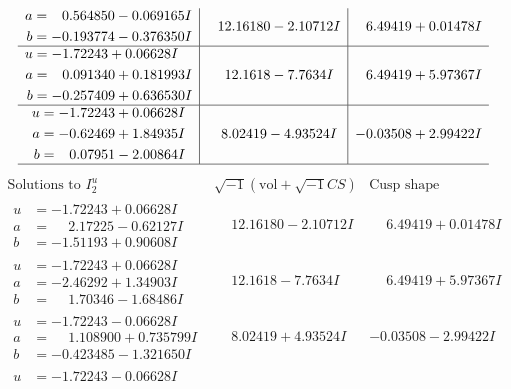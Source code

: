 \documentclass[1p]{elsarticle_modified}
\theoremstyle{definition}
\newcommand{\I}{\sqrt{-1}}
\begin{document}
$$\begin{array}{c|c|c}
\begin{aligned}
a &= \phantom{-}0.564850 - 0.069165 I \\
b &= -0.193774 - 0.376350 I\end{aligned}
 & \phantom{-}12.16180 - 2.10712 I & \phantom{-}6.49419 + 0.01478 I \\ \hline\begin{aligned}
u &= -1.72243 + 0.06628 I \\
a &= \phantom{-}0.091340 + 0.181993 I \\
b &= -0.257409 + 0.636530 I\end{aligned}
 & \phantom{-}12.1618 - 7.7634 I & \phantom{-}6.49419 + 5.97367 I \\ \hline\begin{aligned}
u &= -1.72243 + 0.06628 I \\
a &= -0.62469 + 1.84935 I \\
b &= \phantom{-}0.07951 - 2.00864 I\end{aligned}
 & \phantom{-}8.02419 - 4.93524 I & -0.03508 + 2.99422 I\\
 \hline 
 \end{array}$$\newpage$$\begin{array}{c|c|c}  
\text{Solutions to }I^u_{2}& \I (\text{vol} + \sqrt{-1}CS) & \text{Cusp shape}\\
 \hline 
\begin{aligned}
u &= -1.72243 + 0.06628 I \\
a &= \phantom{-}2.17225 - 0.62127 I \\
b &= -1.51193 + 0.90608 I\end{aligned}
 & \phantom{-}12.16180 - 2.10712 I & \phantom{-}6.49419 + 0.01478 I \\ \hline\begin{aligned}
u &= -1.72243 + 0.06628 I \\
a &= -2.46292 + 1.34903 I \\
b &= \phantom{-}1.70346 - 1.68486 I\end{aligned}
 & \phantom{-}12.1618 - 7.7634 I & \phantom{-}6.49419 + 5.97367 I \\ \hline\begin{aligned}
u &= -1.72243 - 0.06628 I \\
a &= \phantom{-}1.108900 + 0.735799 I \\
b &= -0.423485 - 1.321650 I\end{aligned}
 & \phantom{-}8.02419 + 4.93524 I & -0.03508 - 2.99422 I \\ \hline\begin{aligned}
u &= -1.72243 - 0.06628 I \\

\end{aligned}
\end{array}$$
\end{document}
